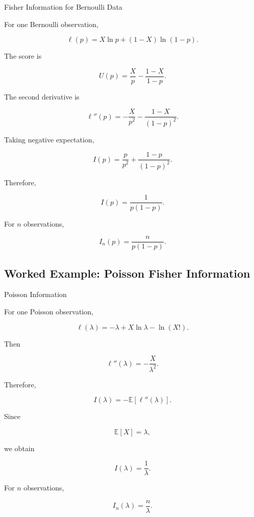 \begin{workedexamplebox}{Fisher Information for Bernoulli Data}

For one Bernoulli observation,

\[
\ell(p)
=
X\ln p
+
(1-X)\ln(1-p).
\]

The score is

\[
U(p)
=
\frac{X}{p}
-
\frac{1-X}{1-p}.
\]

The second derivative is

\[
\ell''(p)
=
-\frac{X}{p^2}
-
\frac{1-X}{(1-p)^2}.
\]

Taking negative expectation,

\[
I(p)
=
\frac{p}{p^2}
+
\frac{1-p}{(1-p)^2}.
\]

Therefore,

\begin{answerbox}
\[
\boxed{
I(p)
=
\frac1{
p(1-p)
}.
}
\]
\end{answerbox}

For \(n\) observations,

\[
\boxed{
I_n(p)
=
\frac{n}{
p(1-p)
}.
}
\]

\end{workedexamplebox}

\subsection{Worked Example: Poisson Fisher Information}
\label{subsec:worked-poisson-information}

\begin{workedexamplebox}{Poisson Information}

For one Poisson observation,

\[
\ell(\lambda)
=
-\lambda
+
X\ln\lambda
-
\ln(X!).
\]

Then

\[
\ell''(\lambda)
=
-\frac{X}{\lambda^2}.
\]

Therefore,

\[
I(\lambda)
=
-
\mathbb{E}
[
\ell''(\lambda)
].
\]

Since

\[
\mathbb{E}[X]=\lambda,
\]

we obtain

\begin{answerbox}
\[
\boxed{
I(\lambda)
=
\frac1\lambda.
}
\]
\end{answerbox}

For \(n\) observations,

\[
\boxed{
I_n(\lambda)
=
\frac n\lambda.
}
\]

\end{workedexamplebox}

